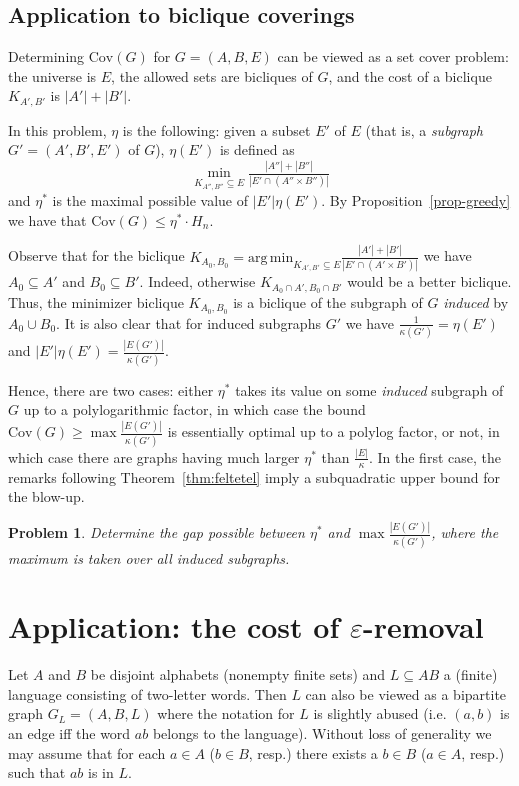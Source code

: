 \documentclass[submission]{llncs}
\def\Cov{{\mathrm{Cov}}}
\newtheorem{openproblem}{Problem}
\begin{document}
\subsection{Application to biclique coverings}
\label{sec-setcover-cov}
  Determining $\Cov(G)$ for $G=(A,B,E)$ can be viewed as a set cover problem: the universe is $E$,
  the allowed sets are bicliques of $G$, and the cost of a biclique $K_{A',B'}$ is $|A'|+|B'|$.

  In this problem, $\eta$ is the following:
  given a subset $E'$ of $E$ (that is, a \emph{subgraph} $G'=(A',B',E')$ of $G$),
  $\eta(E')$ is defined as
  \[\mathop{\min}_{K_{A'',B''}\subseteq E}\tfrac{|A''|+|B''|}{|E'\cap (A''\times B'')|}\]
  and $\eta^*$ is the maximal possible value of $|E'|\eta(E')$.
  By Proposition~\ref{prop-greedy} we have that $\Cov(G)\leq\eta^*\cdot H_n$.

  Observe that for the biclique $K_{A_0,B_0}=\mathrm{arg\,min}_{K_{A',B'}\subseteq E}\frac{|A'|+|B'|}{|E'\cap (A'\times B')|}$
  we have $A_0\subseteq A'$ and $B_0\subseteq B'$. Indeed, otherwise $K_{A_0\cap A',B_0\cap B'}$ would be a better biclique.
  Thus, the minimizer biclique $K_{A_0,B_0}$ is a biclique of the subgraph of $G$ \emph{induced} by $A_0\cup B_0$.
  It is also clear that for induced subgraphs $G'$ we have $\frac{1}{\kappa(G')}=\eta(E')$ and $|E'|\eta(E')=\frac{|E(G')|}{\kappa(G')}$.

  Hence, there are two cases:
  either $\eta^*$ takes its value on some \emph{induced} subgraph of $G$ up to a polylogarithmic factor,
  in which case the bound $\Cov(G)\geq \max\frac{|E(G')|}{\kappa(G')}$ is essentially optimal up to a polylog factor,
  or not, in which case there are graphs having much larger $\eta^*$ than $\frac{|E|}{\kappa}$.
  In the first case, the remarks following Theorem~\ref{thm:feltetel} imply a subquadratic upper bound for the blow-up.











  \begin{openproblem}
  Determine the gap possible between $\eta^*$ and $\max\frac{|E(G')|}{\kappa(G')}$, where the maximum is taken over all induced subgraphs.
  \end{openproblem}


\section{Application: the cost of $\varepsilon$-removal}
\label{sec-app}
Let $A$ and $B$ be disjoint alphabets (nonempty finite sets) and $L\subseteq AB$ a (finite) language consisting of two-letter words.
Then $L$ can also be viewed as a bipartite graph $G_L=(A,B,L)$ where the notation for $L$ is slightly abused (i.e. $(a,b)$ is an edge
iff the word $ab$ belongs to the language). Without loss of generality we may assume that for each $a\in A$ ($b\in B$, resp.)
there exists a $b\in B$ ($a\in A$, resp.) such that $ab$ is in $L$.
\end{document}
